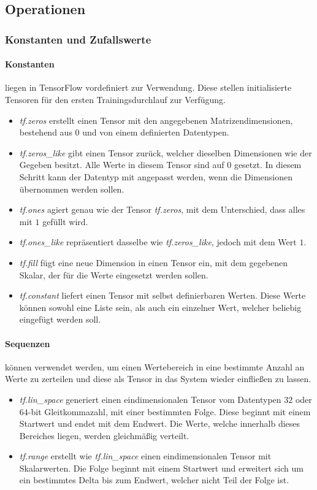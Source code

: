 \subsection{Operationen}

\subsubsection{Konstanten und Zufallswerte}

\paragraph{Konstanten} liegen in TensorFlow vordefiniert zur Verwendung.
Diese stellen initialisierte Tensoren für den ersten Trainingsdurchlauf zur Verfügung.

\begin{itemize}
	\item \textit{tf.zeros} erstellt einen Tensor mit den angegebenen Matrizendimensionen, bestehend aus $0$ und von einem definierten Datentypen. 
	\item \textit{tf.zeros\_like} gibt einen Tensor zurück, welcher dieselben Dimensionen wie der Gegeben besitzt.
	Alle Werte in diesem Tensor sind auf $0$ gesetzt.
	In diesem Schritt kann der Datentyp mit angepasst werden, wenn die Dimensionen übernommen werden sollen.
	\item \textit{tf.ones} agiert genau wie der Tensor \textit{tf.zeros}, mit dem Unterschied, dass alles mit $1$ gefüllt wird.
	\item \textit{tf.ones\_like} repräsentiert dasselbe wie \textit{tf.zeros\_like}, jedoch mit dem Wert $1$.
	\item \textit{tf.fill} fügt eine neue Dimension in einen Tensor ein, mit dem gegebenen Skalar, der für die Werte eingesetzt werden sollen.
	\item \textit{tf.constant} liefert einen Tensor mit selbst definierbaren Werten. 
	Diese Werte können sowohl eine Liste sein, als auch ein einzelner Wert, welcher beliebig eingefügt werden soll. 
\end{itemize}

\paragraph{Sequenzen} können verwendet werden, um einen Wertebereich in eine bestimmte Anzahl an Werte zu zerteilen und diese als Tensor in das System wieder einfließen zu lassen.

\begin{itemize}
	\item \textit{tf.lin\_space} generiert einen eindimensionalen Tensor vom Datentypen $32$ oder $64$-bit Gleitkommazahl, mit einer bestimmten Folge.
	Diese beginnt mit einem Startwert und endet mit dem Endwert. 
	Die Werte, welche innerhalb dieses Bereiches liegen, werden gleichmäßig verteilt. 
	\item \textit{tf.range} erstellt wie \textit{tf.lin\_space} einen eindimensionalen Tensor mit Skalarwerten. 
	Die Folge beginnt mit einem Startwert und erweitert sich um ein bestimmtes Delta bis zum Endwert, welcher nicht Teil der Folge ist. 
\end{itemize}

